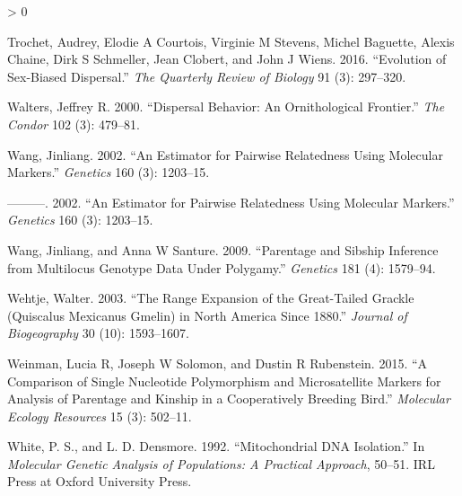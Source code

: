 \documentclass[
]{article}
\newlength{\cslhangindent}
\newenvironment{CSLReferences}[2] %
 {%
  \setlength{\parindent}{0pt}
  \ifodd #1 \everypar{\setlength{\hangindent}{\cslhangindent}}\ignorespaces\fi
  \ifnum #2 > 0
  \setlength{\parskip}{#2\baselineskip}
  \fi
 }%
 {}
\begin{document}
\begin{CSLReferences}{1}{0}
\leavevmode\hypertarget{ref-trochet2016evolution}{}%
Trochet, Audrey, Elodie A Courtois, Virginie M Stevens, Michel Baguette,
Alexis Chaine, Dirk S Schmeller, Jean Clobert, and John J Wiens. 2016.
{``Evolution of Sex-Biased Dispersal.''} \emph{The Quarterly Review of
Biology} 91 (3): 297--320.

\leavevmode\hypertarget{ref-walters2000dispersal}{}%
Walters, Jeffrey R. 2000. {``Dispersal Behavior: An Ornithological
Frontier.''} \emph{The Condor} 102 (3): 479--81.

\leavevmode\hypertarget{ref-wang2002estimator}{}%
Wang, Jinliang. 2002. {``An Estimator for Pairwise Relatedness Using
Molecular Markers.''} \emph{Genetics} 160 (3): 1203--15.

\leavevmode\hypertarget{ref-wang2002estimator}{}%
---------. 2002. {``An Estimator for Pairwise Relatedness Using
Molecular Markers.''} \emph{Genetics} 160 (3): 1203--15.

\leavevmode\hypertarget{ref-wang2009parentage}{}%
Wang, Jinliang, and Anna W Santure. 2009. {``Parentage and Sibship
Inference from Multilocus Genotype Data Under Polygamy.''}
\emph{Genetics} 181 (4): 1579--94.

\leavevmode\hypertarget{ref-wehtje2003range}{}%
Wehtje, Walter. 2003. {``The Range Expansion of the Great-Tailed Grackle
(Quiscalus Mexicanus Gmelin) in North America Since 1880.''}
\emph{Journal of Biogeography} 30 (10): 1593--1607.

\leavevmode\hypertarget{ref-weinman2015comparison}{}%
Weinman, Lucia R, Joseph W Solomon, and Dustin R Rubenstein. 2015. {``A
Comparison of Single Nucleotide Polymorphism and Microsatellite Markers
for Analysis of Parentage and Kinship in a Cooperatively Breeding
Bird.''} \emph{Molecular Ecology Resources} 15 (3): 502--11.

\leavevmode\hypertarget{ref-white1992mitochondrial}{}%
White, P. S., and L. D. Densmore. 1992. {``Mitochondrial DNA
Isolation.''} In \emph{Molecular Genetic Analysis of Populations: A
Practical Approach}, 50--51. IRL Press at Oxford University Press.

\end{CSLReferences}
\end{document}
